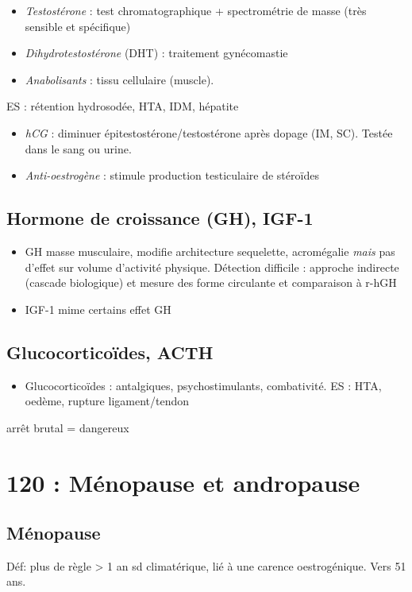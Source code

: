 \documentclass[11pt]{article}
\begin{document}
\vspace*{0.5cm}
\begin{itemize}
\item \emph{Testostérone} : test chromatographique + spectrométrie de masse (très sensible
et spécifique)
\item \emph{Dihydrotestostérone} (DHT) : traitement gynécomastie
\item \emph{Anabolisants} : \inc tissu cellulaire (muscle).
\end{itemize}
ES : rétention hydrosodée, HTA, IDM, hépatite
\begin{itemize}
\item \emph{hCG} : diminuer épitestostérone/testostérone après dopage (IM, SC). Testée dans
le sang ou urine.
\item \emph{Anti-oestrogène} : stimule production testiculaire de stéroïdes
\end{itemize}

\subsection{Hormone de croissance (GH), IGF-1}
\label{sec:orgf74e74f}
\begin{itemize}
\item GH \inc masse musculaire, modifie architecture sequelette, acromégalie \emph{mais}
pas d'effet sur volume d'activité physique. Détection difficile : approche
indirecte (cascade biologique) et mesure des forme circulante et comparaison à r-hGH
\item IGF-1 mime certains effet GH
\end{itemize}

\subsection{Glucocorticoïdes, ACTH}
\label{sec:org1f5efc0}
\begin{itemize}
\item Glucocorticoïdes : antalgiques, psychostimulants, combativité. ES : HTA,
oedème, rupture ligament/tendon
\end{itemize}
\danger arrêt brutal = dangereux \skull

\section{120 : Ménopause et andropause}
\label{sec:org4c3eb67}
\label{sec:120}
\subsection{Ménopause}
\label{sec:orgec0acfa}
Déf: plus de règle > 1 an \textpm{} sd climatérique, lié à une carence
oestrogénique. Vers 51 ans.
\end{document}
